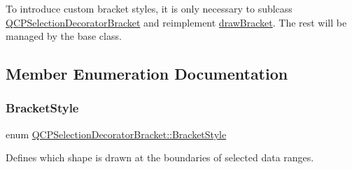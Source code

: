 To introduce custom bracket styles, it is only necessary to sublcass \mbox{\hyperlink{class_q_c_p_selection_decorator_bracket}{Q\+C\+P\+Selection\+Decorator\+Bracket}} and reimplement \mbox{\hyperlink{class_q_c_p_selection_decorator_bracket_a57b65b5508d5bd0f27c9318f3d4646be}{draw\+Bracket}}. The rest will be managed by the base class. 

\subsection{Member Enumeration Documentation}
\mbox{\label{class_q_c_p_selection_decorator_bracket_aa6d18517ec0553575bbef0de4252336e}} 
\subsubsection{\texorpdfstring{BracketStyle}{BracketStyle}}
{\footnotesize\ttfamily enum \mbox{\hyperlink{class_q_c_p_selection_decorator_bracket_aa6d18517ec0553575bbef0de4252336e}{Q\+C\+P\+Selection\+Decorator\+Bracket\+::\+Bracket\+Style}}}

Defines which shape is drawn at the boundaries of selected data ranges.


